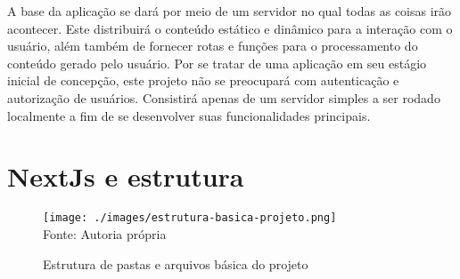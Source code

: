 A base da aplicação se dará por meio de um servidor no qual todas as
coisas irão acontecer. Este distribuirá o conteúdo estático e dinâmico
para a interação com o usuário, além também de fornecer rotas e funções
para o processamento do conteúdo gerado pelo usuário.
Por se tratar de uma aplicação em seu estágio inicial de concepção,
este projeto não se preocupará com autenticação e autorização de usuários.
Consistirá apenas de um servidor simples a ser rodado localmente a fim de
se desenvolver suas funcionalidades principais.

\section{NextJs e estrutura}

\begin{figure}[H]
    \centering
    \caption{Estrutura de pastas e arquivos básica do projeto}
    \texttt{[image: ./images/estrutura-basica-projeto.png]}
    \label{fig:estrutura-basica-projeto} \\
    \textnormal{\fontsize{10pt}{12pt}Fonte: Autoria própria}
\end{figure}

